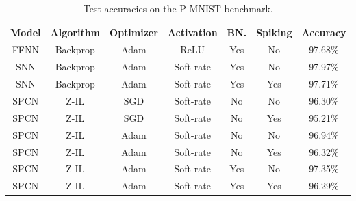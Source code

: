 \documentclass[a4paper,11pt]{article}
\begin{document}
\begin{table}[ht]
  \centering
  \begin{tabular}{|c | c | c | c | c | c | c |}
  \hline
  \textbf{Model}          & \textbf{Algorithm}        & \textbf{Optimizer}    & \textbf{Activation}         & \textbf{BN.}          & \textbf{Spiking}   & \textbf{Accuracy}      \\ \hline
   FFNN                   & Backprop                  & Adam                  & ReLU                        & Yes                   & No                 & 97.68\%                \\
   SNN                    & Backprop                  & Adam                  & Soft-rate                   & Yes                   & No                 & 97.97\%                \\
   SNN                    & Backprop                  & Adam                  & Soft-rate                   & Yes                   & Yes                & 97.71\%                \\ 
   SPCN                   & Z-IL                      & SGD                   & Soft-rate                   & No                    & No                 & 96.30\%                \\
   SPCN                   & Z-IL                      & SGD                   & Soft-rate                   & No                    & Yes                & 95.21\%                \\
   SPCN                   & Z-IL                      & Adam                  & Soft-rate                   & No                    & No                 & 96.94\%                \\ 
   SPCN                   & Z-IL                      & Adam                  & Soft-rate                   & No                    & Yes                & 96.32\%                \\ 
   SPCN                   & Z-IL                      & Adam                  & Soft-rate                   & Yes                   & No                 & 97.35\%                \\
   SPCN                   & Z-IL                      & Adam                  & Soft-rate                   & Yes                   & Yes                & 96.29\%                \\ 
    \hline
  \end{tabular}
  \caption{Test accuracies on the P-MNIST benchmark.}
  \label{fig:snn-accuracies}
\end{table} \\
\end{document}
